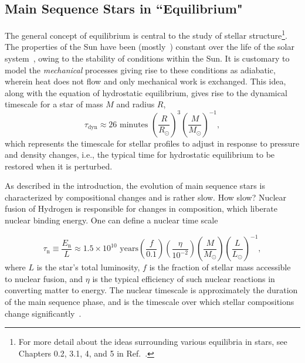 \documentclass[12pt]{article}
\newcommand{\bigparenthesis}[1]{\left(#1\right)}
\begin{document}
\subsection{Main Sequence Stars in ``Equilibrium"} \label{sec:equilibria}
The general concept of equilibrium is central to the study of stellar structure\footnote{For more detail about the ideas surrounding various equilibria in stars, see Chapters 0.2, 3.1, 4, and 5 in Ref.~\cite{Cox_Giuli_vol1}.}. The properties of the Sun have been (mostly~\cite{Feulner_2012}) constant over the life of the solar system~\cite{Christensen_Dalsgaard_2021}, owing to the stability of conditions within the Sun. It is customary to model the \textit{mechanical} processes giving rise to these conditions as adiabatic, wherein heat does not flow and only mechanical work is exchanged. This idea, along with the equation of hydrostatic equilibrium, gives rise to the dynamical timescale for a star of mass $M$ and radius $R$,
%
\begin{equation}
    \tau_\mathrm{dyn} \approx 26 \text{ minutes } \bigparenthesis{\frac{R}{R_\odot}}^3 \bigparenthesis{\frac{M}{M_\odot}}^{-1},
\end{equation}%
%
which represents the timescale for stellar profiles to adjust in response to pressure and density changes, i.e., the typical time for hydrostatic equilibrium to be restored when it is perturbed. 

As described in the introduction, the evolution of main sequence stars is characterized by compositional changes and is rather slow. How slow? Nuclear fusion of Hydrogen is responsible for changes in composition, which liberate nuclear binding energy. One can define a nuclear time scale

\begin{equation}
    \tau_\mathrm{n} \equiv \frac{E_\mathrm{n}}{L} \approx 1.5 \times 10^{10} \text{ years} \bigparenthesis{\frac{f}{0.1}}\bigparenthesis{\frac{\eta}{10^{-2}}} \bigparenthesis{\frac{M}{M_\odot}} \bigparenthesis{\frac{L}{L_\odot}}^{-1},
\end{equation}
%
where $L$ is the star's total luminosity, $f$ is the fraction of stellar mass accessible to nuclear fusion, and $\eta$ is the typical efficiency of such nuclear reactions in converting matter to energy. The nuclear timescale is approximately the duration of the main sequence phase, and is the timescale over which stellar compositions change significantly~\cite{Cox_Giuli_vol1}.
\end{document}

